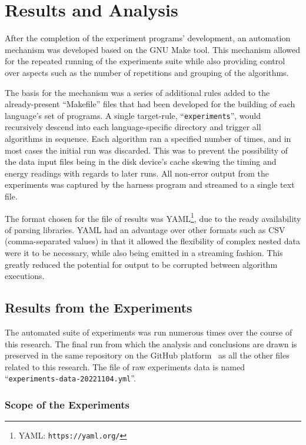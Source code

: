 \section{Results and Analysis}
\label{sec:results}

After the completion of the experiment programs' development, an automation mechanism was developed based on the GNU Make tool. This mechanism allowed for the repeated running of the experiments suite while also providing control over aspects such as the number of repetitions and grouping of the algorithms.

The basis for the mechanism was a series of additional rules added to the already-present ``Makefile'' files that had been developed for the building of each language's set of programs. A single target-rule, ``\texttt{experiments}'', would recursively descend into each language-specific directory and trigger all algorithms in sequence. Each algorithm ran a specified number of times, and in most cases the initial run was discarded. This was to prevent the possibility of the data input files being in the disk device's cache skewing the timing and energy readings with regards to later runs. All non-error output from the experiments was captured by the harness program and streamed to a single text file.

The format chosen for the file of results was YAML\footnote{YAML: \texttt{https://yaml.org/}}, due to the ready availability of parsing libraries. YAML had an advantage over other formats such as CSV (comma-separated values) in that it allowed the flexibility of complex nested data were it to be necessary, while also being emitted in a streaming fashion. This greatly reduced the potential for output to be corrupted between algorithm executions.

\subsection{Results from the Experiments}
\label{subsec:results}

The automated suite of experiments was run numerous times over the course of this research. The final run from which the analysis and conclusions are drawn is preserved in the same repository on the GitHub platform~\cite{github} as all the other files related to this research. The file of raw experiments data is named ``\texttt{experiments-data-20221104.yml}''.

\subsubsection{Scope of the Experiments}

